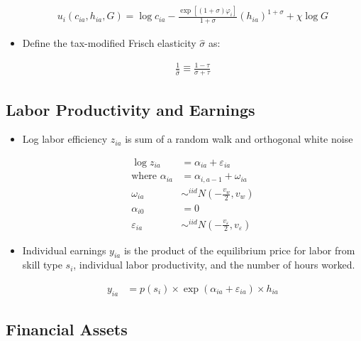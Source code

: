 \documentclass{article}
\begin{document}
\begin{itemize}
\begin{align}
u_i(c_{ia}, h_{ia}, G) = \log c_{ia} - \frac{\exp [(1+\sigma) \varphi_i] }{1 + \sigma} (h_{ia})^{1 + \sigma} + \chi \log G
\end{align}

\item Define the tax-modified Frisch elasticity $\hat \sigma$ as:

\begin{align}
\frac{1}{\hat \sigma} \equiv \frac{1 - \tau}{\sigma + \tau}
\end{align}

\end{itemize}

\subsection{Labor Productivity and Earnings}

\begin{itemize}

\item Log labor efficiency $z_{ia}$ is sum of a random walk and orthogonal white noise

\begin{align}
\log z_{ia} &= \alpha_{ia} + \varepsilon_{ia} \\
\text{where }
\alpha_{ia} &= \alpha_{i, a - 1} + \omega_{ia} \nonumber\\
\omega_{ia} &\sim^{iid} N(-\frac{v_w}{2}, v_w) \nonumber \\
\alpha_{i0} &= 0 \nonumber\\
\varepsilon_{ia} &\sim^{iid} N(-\frac{v_\varepsilon}{2}, v_\varepsilon) \nonumber
\end{align}

\item Individual earnings $y_{ia}$ is the product of the equilibrium price for labor from skill type $s_i$, individual labor productivity, and the number of hours worked.

\begin{align}
y_{ia} &= p(s_i) \times \exp( \alpha_{ia} + \varepsilon_{ia}) \times h_{ia}
\end{align}

\end{itemize}

\subsection{Financial Assets}
\end{document}
